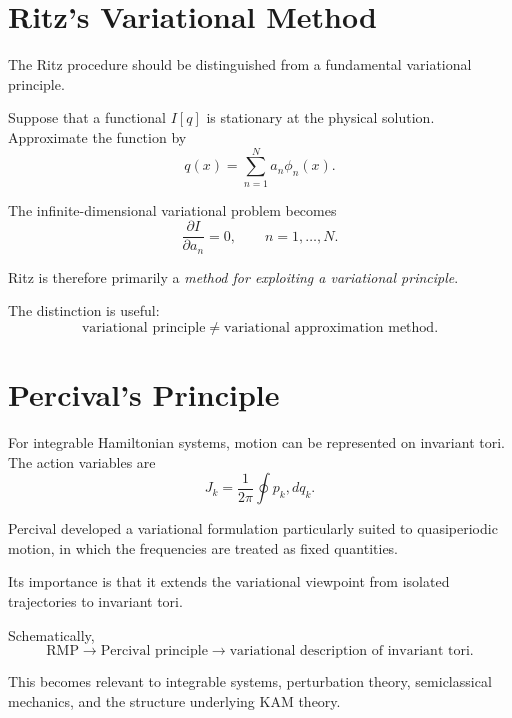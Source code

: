 \section{Ritz's Variational Method}

The Ritz procedure should be distinguished from a fundamental variational principle.

Suppose that a functional $I[q]$ is stationary at the physical solution.  Approximate the function by
\begin{equation}
q(x)
=
\sum_{n=1}^N a_n\phi_n(x).
\end{equation}

The infinite-dimensional variational problem becomes
\begin{equation}
\frac{\partial I}{\partial a_n}=0,
\qquad
n=1,\ldots,N.
\end{equation}

Ritz is therefore primarily a \emph{method for exploiting a variational principle}.

The distinction is useful:
\begin{equation}
\boxed{
\text{variational principle}
\neq
\text{variational approximation method}.
}
\end{equation}

\section{Percival's Principle}

For integrable Hamiltonian systems, motion can be represented on invariant tori.  The action variables are
\begin{equation}
J_k
=
\frac{1}{2\pi}
\oint p_k,dq_k.
\end{equation}

Percival developed a variational formulation particularly suited to quasiperiodic motion, in which the frequencies are treated as fixed quantities.

Its importance is that it extends the variational viewpoint from isolated trajectories to invariant tori.

Schematically,
\begin{equation}
\boxed{
\text{RMP}
\longrightarrow
\text{Percival principle}
\longrightarrow
\text{variational description of invariant tori}.
}
\end{equation}

This becomes relevant to integrable systems, perturbation theory, semiclassical mechanics, and the structure underlying KAM theory.

